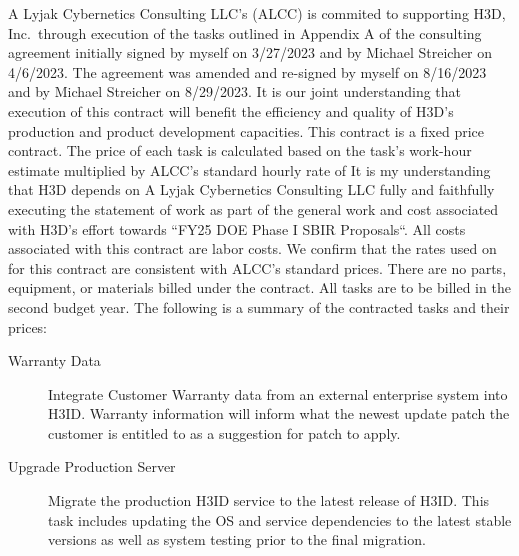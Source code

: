 \documentclass[8pt, letterpaper]{awesome-cv} %
\begin{document}
\makecvheader %

\makelettertitle %


\begin{cvletter}
  A Lyjak Cybernetics Consulting LLC's (ALCC) is commited to supporting H3D, Inc.\ through execution
  of the tasks outlined in Appendix A of the consulting agreement initially signed by myself on
  3/27/2023 and by Michael Streicher on 4/6/2023. The agreement was amended and re-signed by myself
  on 8/16/2023 and by Michael Streicher on 8/29/2023. It is our joint understanding that execution
  of this contract will benefit the efficiency and quality of H3D's production and product
  development capacities. This contract is a fixed price contract. The price of each task is
  calculated based on the task's work-hour estimate multiplied by ALCC's standard hourly rate of
   It is my understanding that H3D depends on A Lyjak Cybernetics
  Consulting LLC fully and faithfully executing the statement of work as part of the general work
  and cost associated with H3D's effort towards ``FY25 DOE Phase I SBIR Proposals``. All costs
  associated with this contract are labor costs. We confirm that the rates used on for this contract
  are consistent with ALCC's standard prices. There are no parts, equipment, or materials billed
  under the contract. All tasks are to be billed in the second budget year. The following is a
  summary of the contracted tasks and their prices:

  \begin{description}
    \item[Warranty Data] Integrate Customer Warranty data from an external enterprise system into
      H3ID. Warranty information will inform what the newest update patch the customer is entitled
      to as a suggestion for patch to apply. 

    \item[Upgrade Production Server] Migrate the production H3ID service to the latest release of
      H3ID. This task includes updating the OS and service dependencies to the latest stable
      versions as well as system testing prior to the final migration. 


\end{description}
\end{cvletter}
\end{document}
